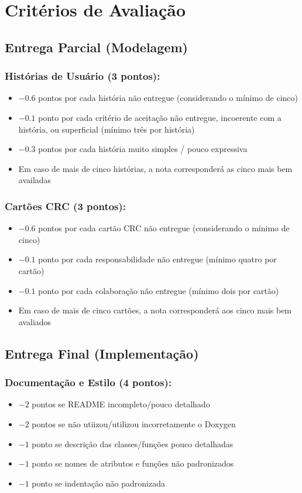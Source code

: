 \documentclass[11pt]{article}
\begin{document}
\section{Critérios de Avaliação}
\label{sec:orgad8dce4}

\subsection{Entrega Parcial (Modelagem)}
\label{sec:org3f1337d}

\subsubsection{Histórias de Usuário (3 pontos):}
\label{sec:org6cee8c5}
\begin{itemize}
\item \(-0.6\) pontos por cada história não entregue (considerando o mínimo de cinco)
\item \(-0.1\) ponto por cada critério de aceitação não entregue,
incoerente com a história, ou superficial (mínimo três por história)
\item \(-0.3\) pontos por cada história muito simples / pouco expressiva
\item Em caso de mais de cinco histórias, a nota corresponderá as cinco
mais bem availadas
\end{itemize}
\subsubsection{Cartões CRC (3 pontos):}
\label{sec:org3ac1486}
\begin{itemize}
\item \(-0.6\) pontos por cada cartão CRC não entregue (considerando o mínimo de cinco)
\item \(-0.1\) ponto por cada responsabilidade não entregue (mínimo  quatro por cartão)
\item \(-0.1\) ponto por cada colaboração não entregue (mínimo dois por cartão)
\item Em caso de mais de cinco cartões, a nota corresponderá aos cinco
mais bem avaliados
\end{itemize}
\subsection{Entrega Final (Implementação)}
\label{sec:orga9422b7}

\subsubsection{Documentação e Estilo (4 pontos):}
\label{sec:org9f00ffe}
\begin{itemize}
\item \(-2\) pontos se README incompleto/pouco detalhado
\item \(-2\) pontos se não utiizou/utilizou incorretamente o Doxygen
\item \(-1\) ponto se descrição das classes/funções pouco detalhadas
\item \(-1\) ponto se nomes de atributos e funções não padronizados
\item \(-1\) ponto se indentação não padronizada
\end{itemize}
\end{document}
